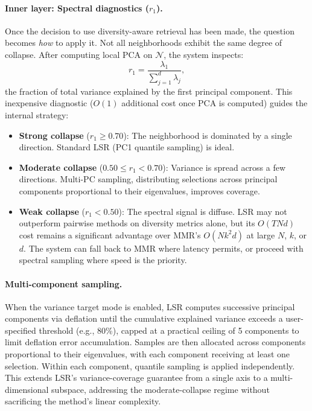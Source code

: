 \documentclass{article}
\begin{document}
\paragraph{Inner layer: Spectral diagnostics ($r_1$).}
Once the decision to use diversity-aware retrieval has been made, the question becomes \emph{how} to apply it. Not all neighborhoods exhibit the same degree of collapse. After computing local PCA on $\mathcal{N}$, the system inspects:
\begin{equation}
    r_1 = \frac{\lambda_1}{\sum_{j=1}^{d} \lambda_j},
\end{equation}
the fraction of total variance explained by the first principal component. This inexpensive diagnostic ($O(1)$ additional cost once PCA is computed) guides the internal strategy:

\begin{itemize}
    \item \textbf{Strong collapse} ($r_1 \geq 0.70$): The neighborhood is dominated by a single direction. Standard LSR (PC1 quantile sampling) is ideal.
    \item \textbf{Moderate collapse} ($0.50 \leq r_1 < 0.70$): Variance is spread across a few directions. Multi-PC sampling, distributing selections across principal components proportional to their eigenvalues, improves coverage.
    \item \textbf{Weak collapse} ($r_1 < 0.50$): The spectral signal is diffuse. LSR may not outperform pairwise methods on diversity metrics alone, but its $O(TNd)$ cost remains a significant advantage over MMR's $O(Nk^2d)$ at large $N$, $k$, or $d$. The system can fall back to MMR where latency permits, or proceed with spectral sampling where speed is the priority.
\end{itemize}

\paragraph{Multi-component sampling.}
When the variance target mode is enabled, LSR computes successive principal components via deflation until the cumulative explained variance exceeds a user-specified threshold (e.g., 80\%), capped at a practical ceiling of 5 components to limit deflation error accumulation. Samples are then allocated across components proportional to their eigenvalues, with each component receiving at least one selection. Within each component, quantile sampling is applied independently. This extends LSR's variance-coverage guarantee from a single axis to a multi-dimensional subspace, addressing the moderate-collapse regime without sacrificing the method's linear complexity.
\end{document}
